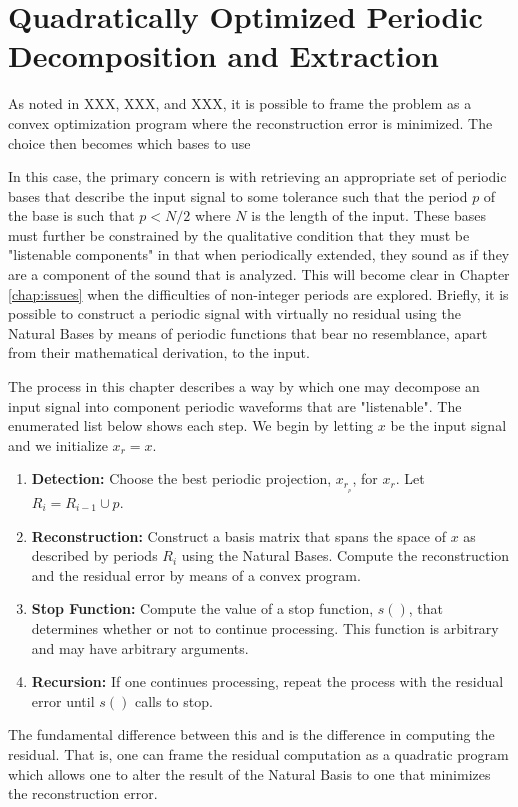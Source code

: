 \chapter{Quadratically Optimized Periodic Decomposition and Extraction}\label{chap:qo}

As noted in XXX, XXX, and XXX, it is possible to frame the problem as a convex optimization program where the reconstruction error is minimized. The choice then becomes which bases to use



In this case, the primary concern is with retrieving an appropriate set of periodic bases that describe the input signal to some tolerance such that the period $p$ of the base is such that $p < N/2$ where $N$ is the length of the input. These bases must further be constrained by the qualitative condition that they must be "listenable components" in that when periodically extended, they sound as if they are a component of the sound that is analyzed. This will become clear in Chapter \ref{chap:issues} when the difficulties of non-integer periods are explored. Briefly, it is possible to construct a periodic signal with virtually no residual using the Natural Bases by means of periodic functions that bear no resemblance, apart from their mathematical derivation, to the input.

The process in this chapter describes a way by which one may decompose an input signal into component periodic waveforms that are "listenable". The enumerated list below shows each step. We begin by letting $x$ be the input signal and we initialize $x_r = x$.
\begin{enumerate}
    \item\textbf{Detection:} Choose the best periodic projection, $x_{r_{_p}}$, for $x_r$. Let $R_i = R_{i-1} \cup p$.
    \item\textbf{Reconstruction:} Construct a basis matrix that spans the space of $x$ as described by periods $R_i$ using the Natural Bases. Compute the reconstruction and the residual error by means of a convex program.
    \item\textbf{Stop Function:} Compute the value of a stop function, $s()$, that determines whether or not to continue processing. This function is arbitrary and may have arbitrary arguments.
    \item\textbf{Recursion:} If one continues processing, repeat the process with the residual error until $s()$ calls to stop.
\end{enumerate}
The fundamental difference between this and \cite{sethares1999periodicity} is the difference in computing the residual. That is, one can frame the residual computation as a quadratic program which allows one to alter the result of the Natural Basis to one that minimizes the reconstruction error.

